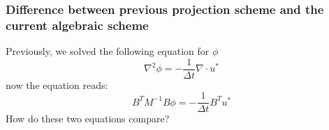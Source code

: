 \begin{frame}
\frametitle{Difference between previous projection scheme and 
the current algebraic scheme}

Previously, we solved 
the following equation for $\phi$ 
\[
\nabla^2  \phi = - \frac{1}{\Delta t} \nabla \cdot u^* 
\]
now the equation reads:  
\[
B^T M^{-1} B \phi = - \frac{1}{\Delta t} B^T u^* 
\]
How do these two equations compare? 


\end{frame}

